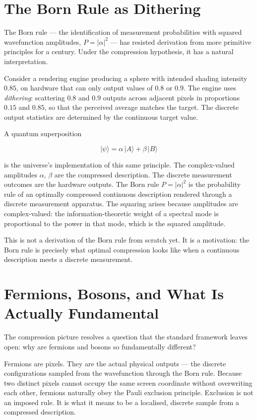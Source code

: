 \section{The Born Rule as Dithering}

The Born rule --- the identification of measurement probabilities with
squared wavefunction amplitudes, $P = |\alpha|^2$ --- has resisted
derivation from more primitive principles for a century. Under the
compression hypothesis, it has a natural interpretation.

Consider a rendering engine producing a sphere with intended shading
intensity $0.85$, on hardware that can only output values of $0.8$ or
$0.9$. The engine uses \emph{dithering}: scattering $0.8$ and $0.9$
outputs across adjacent pixels in proportions $0.15$ and $0.85$, so
that the perceived average matches the target. The discrete output
statistics are determined by the continuous target value.

A quantum superposition

\[
|\psi\rangle = \alpha\,|A\rangle + \beta\,|B\rangle
\]

is the universe's implementation of this same principle. The
complex-valued amplitudes $\alpha$, $\beta$ are the compressed
description. The discrete measurement outcomes are the hardware outputs.
The Born rule $P = |\alpha|^2$ is the probability rule of an optimally
compressed continuous description rendered through a discrete measurement
apparatus. The squaring arises because amplitudes are complex-valued: the
information-theoretic weight of a spectral mode is proportional to the
power in that mode, which is the squared amplitude.

This is not a derivation of the Born rule from scratch yet. It is a
motivation: the Born rule is precisely what optimal compression looks
like when a continuous description meets a discrete measurement. 

\section{Fermions, Bosons, and What Is Actually Fundamental}

The compression picture resolves a question that the standard framework
leaves open: why are fermions and bosons so fundamentally different?

Fermions are pixels. They are the actual physical outputs --- the
discrete configurations sampled from the wavefunction through the Born
rule. Because two distinct pixels cannot occupy the same screen
coordinate without overwriting each other, fermions naturally obey the
Pauli exclusion principle. Exclusion is not an imposed rule. It is what
it means to be a localised, discrete sample from a compressed
description.

